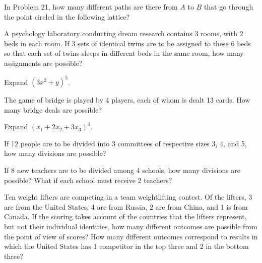 \documentclass[12pt]{article}
\newenvironment{problem}[2][Problem]{\begin{trivlist}
\item[\hskip \labelsep {\bfseries #1}\hskip \labelsep {\bfseries #2.}]}{\end{trivlist}}
\begin{document}
\begin{problem}{  1.22 }
In Problem 21, how many different paths are there from $A$ to $B$ that go through the point circled in the following lattice?
\end{problem}


\begin{problem}{1.23   }
A psychology laboratory conducting dream research contains 3 rooms, with 2 beds in each room. If 3 sets of identical twins are to be assigned to these 6 beds so that each set of twins sleeps in different beds in the same room, how many assignments are possible?
\end{problem}



\begin{problem}{  1.24 }
Expand $\left(3x^2 + y\right)^5$.
\end{problem}



\begin{problem}{ 1.25  }
The game of bridge is played by 4 players, each of whom is dealt 13 cards. How many bridge deals are possible?
\end{problem}

\begin{problem}{  1.26 }
Expand $\left(x_1 + 2x_2 + 3x_3\right)^4$.
\end{problem}


\begin{problem}{  1.27 }
If 12 people are to be divided into 3 committees of respective sizes 3, 4, and 5, how many divisions are possible?
\end{problem}



\begin{problem}{  1.28 }
If 8 new teachers are to be divided among 4 schools, how many divisions are possible? What if each school must receive 2 teachers?
\end{problem}



\begin{problem}{  1.29 }
Ten weight lifters are competing in a team weightlifting contest. Of the lifters, 3 are from the United States, 4 are from Russia, 2 are from China, and 1 is from Canada. If the scoring takes account of the countries that the lifters represent, but not their individual identities, how many different outcomes are possible from the point of view of scores? How many different outcomes correspond to results in which the United States has 1 competitor in the top three and 2 in the bottom three?
\end{problem}
\end{document}
